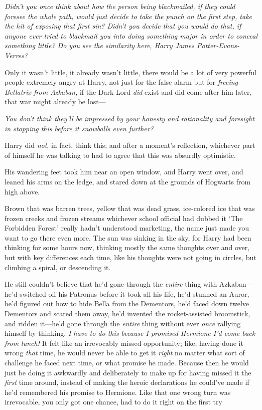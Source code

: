 \emph{Didn't you once think about how the person being blackmailed, if they
could foresee the whole path, would just decide to take the punch on the first
step, take the hit of exposing that first sin? Didn't you decide that you would
do that, if anyone ever tried to blackmail you into doing something major in
order to conceal something little? Do you see the similarity here, Harry James
Potter-Evans-Verres?}

Only it wasn't little, it already wasn't little, there would be a lot of very
powerful people extremely angry at Harry, not just for the false alarm but for
\emph{freeing Bellatrix from Azkaban,} if the Dark Lord \emph{did} exist and
did come after him later, that war might already be lost---

\emph{You don't think they'll be impressed by your honesty and rationality and
foresight in stopping this before it snowballs even further?}

Harry did \emph{not}, in fact, think this; and after a moment's reflection,
whichever part of himself he was talking to had to agree that this was
absurdly optimistic.

His wandering feet took him near an open window, and Harry went over, and
leaned his arms on the ledge, and stared down at the grounds of Hogwarts from
high above.

Brown that was barren trees, yellow that was dead grass, ice-colored ice that
was frozen creeks and frozen streams{\el} whichever school official had
dubbed it `The Forbidden Forest' really hadn't understood marketing, the name
just made you want to go there even more. The sun was sinking in the sky, for
Harry had been thinking for some hours now, thinking mostly the same thoughts
over and over, but with key differences each time, like his thoughts were not
going in circles, but climbing a spiral, or descending it.

He still couldn't believe that he'd gone through the \emph{entire} thing with
Azkaban---he'd switched off his Patronus before it took all his life, he'd
stunned an Auror, he'd figured out how to hide Bella from the Dementors, he'd
faced down twelve Dementors and scared them away, he'd invented the
rocket-assisted broomstick, and ridden it---he'd gone through the \emph{entire}
thing without ever \emph{once} rallying himself by thinking, \emph{I have to do
this{\el} because{\el} I promised Hermione I'd come back from lunch!} It
felt like an irrevocably missed opportunity; like, having done it wrong
\emph{that} time, he would never be able to get it \emph{right} no matter what
sort of challenge he faced next time, or what promise he made. Because then he
would just be doing it awkwardly and deliberately to make up for having missed
it the \emph{first} time around, instead of making the heroic declarations he
could've made if he'd remembered his promise to Hermione. Like that one wrong
turn was irrevocable, you only got one chance, had to do it right on the first
try{\el}


